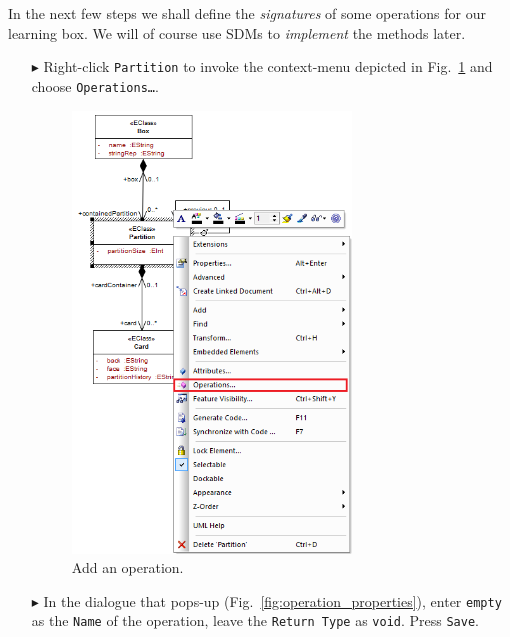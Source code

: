 In the next few steps we shall define the \emph{signatures} of some operations for our learning box.
We will of course use SDMs to \emph{implement} the methods later.

\begin{enumerate}
\item[$\blacktriangleright$] Right-click \texttt{Partition} to invoke the context-menu depicted in Fig.~\ref{fig:add_operation} and choose \texttt{Operations\ldots}.

\begin{figure}[htbp]
	\centering
  \includegraphics[width=0.7\textwidth]{pics/memBoxBilder/memBox35.png}
	\caption{Add an operation.}
	\label{fig:add_operation}
\end{figure}
\FloatBarrier

\item[$\blacktriangleright$] In the dialogue that pops-up (Fig.~\ref{fig:operation_properties}), enter \texttt{empty} as the \texttt{Name} of the operation, leave the \texttt{Return Type} as \texttt{void}.  Press \texttt{Save}.


\end{enumerate}
